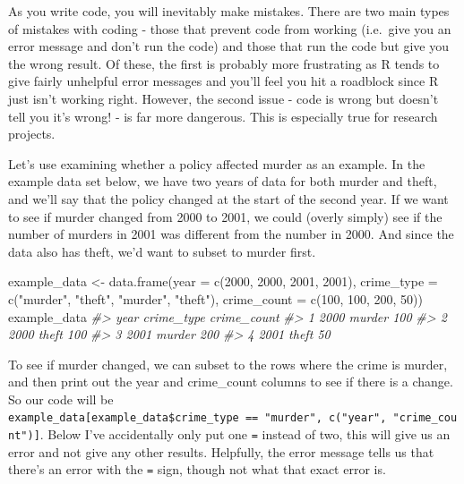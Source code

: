 \documentclass[
]{krantz}
\makeatletter
\newenvironment{Shaded}{\begin{snugshade}}{\end{snugshade}}
\newcommand{\AttributeTok}[1]{\textcolor[rgb]{0.61,0.61,0.61}{#1}}
\newcommand{\CommentTok}[1]{\textcolor[rgb]{0.37,0.37,0.37}{\textit{#1}}}
\newcommand{\DecValTok}[1]{\textcolor[rgb]{0.06,0.06,0.06}{#1}}
\newcommand{\FunctionTok}[1]{\textcolor[rgb]{0,0,0}{#1}}
\newcommand{\NormalTok}[1]{#1}
\newcommand{\OtherTok}[1]{\textcolor[rgb]{0.37,0.37,0.37}{#1}}
\newcommand{\StringTok}[1]{\textcolor[rgb]{0.5,0.5,0.5}{#1}}
\newenvironment{kframe}{%
\medskip{}
\setlength{\fboxsep}{.8em}
 \def\at@end@of@kframe{}%
 \ifinner\ifhmode%
  \def\at@end@of@kframe{\end{minipage}}%
  \begin{minipage}{\columnwidth}%
 \fi\fi%
 \def\FrameCommand##1{\hskip\@totalleftmargin \hskip-\fboxsep
 \colorbox{shadecolor}{##1}\hskip-\fboxsep
     \hskip-\linewidth \hskip-\@totalleftmargin \hskip\columnwidth}%
 \MakeFramed {\advance\hsize-\width
   \@totalleftmargin\z@ \linewidth\hsize
   \@setminipage}}%
 {\par\unskip\endMakeFramed%
 \at@end@of@kframe}
\renewenvironment{Shaded}{\begin{kframe}}{\end{kframe}}
\makeatother
\begin{document}
As you write code, you will inevitably make mistakes. There are two main types of mistakes with coding - those that prevent code from working (i.e.~give you an error message and don't run the code) and those that run the code but give you the wrong result. Of these, the first is probably more frustrating as R tends to give fairly unhelpful error messages and you'll feel you hit a roadblock since R just isn't working right. However, the second issue - code is wrong but doesn't tell you it's wrong! - is far more dangerous. This is especially true for research projects.

Let's use examining whether a policy affected murder as an example. In the example data set below, we have two years of data for both murder and theft, and we'll say that the policy changed at the start of the second year. If we want to see if murder changed from 2000 to 2001, we could (overly simply) see if the number of murders in 2001 was different from the number in 2000. And since the data also has theft, we'd want to subset to murder first.

\begin{Shaded}
\begin{Highlighting}[]
\NormalTok{example\_data }\OtherTok{\textless{}{-}} \FunctionTok{data.frame}\NormalTok{(}\AttributeTok{year =} \FunctionTok{c}\NormalTok{(}\DecValTok{2000}\NormalTok{, }\DecValTok{2000}\NormalTok{, }\DecValTok{2001}\NormalTok{, }\DecValTok{2001}\NormalTok{),}
  \AttributeTok{crime\_type =} \FunctionTok{c}\NormalTok{(}\StringTok{"murder"}\NormalTok{, }\StringTok{"theft"}\NormalTok{, }\StringTok{"murder"}\NormalTok{, }\StringTok{"theft"}\NormalTok{),}
  \AttributeTok{crime\_count =} \FunctionTok{c}\NormalTok{(}\DecValTok{100}\NormalTok{, }\DecValTok{100}\NormalTok{, }\DecValTok{200}\NormalTok{, }\DecValTok{50}\NormalTok{))}
\NormalTok{example\_data}
\CommentTok{\#\textgreater{}   year crime\_type crime\_count}
\CommentTok{\#\textgreater{} 1 2000     murder         100}
\CommentTok{\#\textgreater{} 2 2000      theft         100}
\CommentTok{\#\textgreater{} 3 2001     murder         200}
\CommentTok{\#\textgreater{} 4 2001      theft          50}
\end{Highlighting}
\end{Shaded}

To see if murder changed, we can subset to the rows where the crime is murder, and then print out the year and crime\_count columns to see if there is a change. So our code will be \texttt{example\_data{[}example\_data\$crime\_type\ ==\ "murder",\ c("year",\ "crime\_count"){]}}. Below I've accidentally only put one \texttt{=} instead of two, this will give us an error and not give any other results. Helpfully, the error message tells us that there's an error with the \texttt{=} sign, though not what that exact error is.
\end{document}
